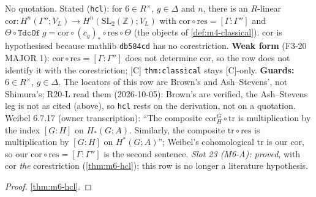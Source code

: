 \begin{theorem}[Proved (M6-A): Brown III.9.5, Ash--Stevens \S1.1: $T_{\Gamma g\Gamma}=\mathrm{cor}\circ(c_g)_*\circ\mathrm{res}$, on the model]\label{lit:hecke-classical}
   \leanok
  No quotation. Stated (\texttt{hcl}): for $6\in R^\times$, $g\in\Delta$ and $n$, there is an $R$-linear
  $\mathrm{cor}\colon H^n(\Gamma'';V_L)\to H^n(\mathrm{SL}_2(\mathbb Z);V_L)$ with $\mathrm{cor}\circ\mathrm{res}=[\Gamma:\Gamma'']$ and
  $\Theta\circ\texttt{TdcOf}~g=\mathrm{cor}\circ(c_g)_*\circ\mathrm{res}\circ\Theta$ (the objects of \ref{def:m4-classical}).
  $\mathrm{cor}$ is hypothesised because mathlib \texttt{db584cd} has no corestriction. \textbf{Weak form} (F3-20 MAJOR 1):
  $\mathrm{cor}\circ\mathrm{res}=[\Gamma:\Gamma'']$ does not determine $\mathrm{cor}$, so the row does not identify it with the
  corestriction; [C] \texttt{thm:classical} stays [C]-only. \textbf{Guards:} $6\in R^\times$, $g\in\Delta$.
  The locators of this row are Brown's and Ash--Stevens', not Shimura's; R20-L read them (2026-10-05): Brown's are verified,
  the Ash--Stevens leg is not as cited (above), so \texttt{hcl} rests on the derivation, not on a quotation. Weibel 6.7.17 (owner
  transcription): ``The composite $\mathrm{cor}^G_H\circ\mathrm{tr}$ is multiplication by the index $[G:H]$ on $H_*(G;A)$. Similarly,
  the composite $\mathrm{tr}\circ\mathrm{res}$ is multiplication by $[G:H]$ on $H^*(G;A)$''; Weibel's cohomological $\mathrm{tr}$ is
  our $\mathrm{cor}$, so our $\mathrm{cor}\circ\mathrm{res}=[\Gamma:\Gamma'']$ is the second sentence.
  \emph{Slot 23 (M6-A): proved}, with $\mathrm{cor}$ \emph{the} corestriction (\ref{thm:m6-hcl}); this row is no longer a literature
  hypothesis.
\end{theorem}
\begin{proof}
  \leanok
  \ref{thm:m6-hcl}.
\end{proof}
